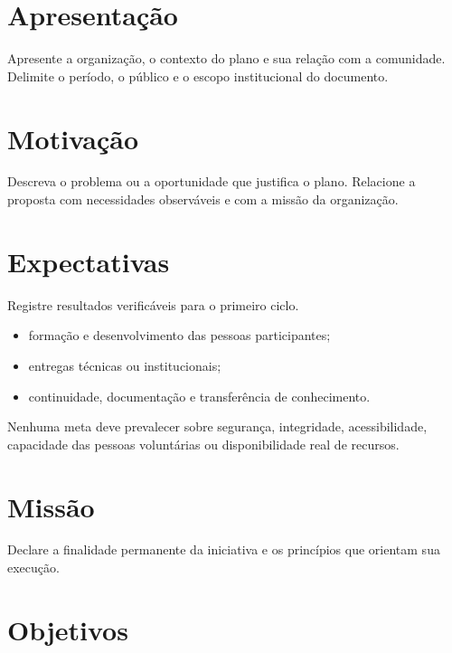 \documentclass[ %
  paper-size=a4,
  font-size=11pt,
  two-sided=true,
  title-page=true,
  section-numbering=two-digit,
  inner-margin=22mm,
  outer-margin=22mm,
  top-margin=24mm,
  bottom-margin=28mm,
  binding-offset=0mm,
  color-model=rgb
]{ieeeufgcs}
\begin{document}
\maketitle

\section{Apresentação}

Apresente a organização, o contexto do plano e sua relação com a comunidade.
Delimite o período, o público e o escopo institucional do documento.

\section{Motivação}

Descreva o problema ou a oportunidade que justifica o plano. Relacione a
proposta com necessidades observáveis e com a missão da organização.

\section{Expectativas}

Registre resultados verificáveis para o primeiro ciclo.

\begin{itemize}
  \item formação e desenvolvimento das pessoas participantes;
  \item entregas técnicas ou institucionais;
  \item continuidade, documentação e transferência de conhecimento.
\end{itemize}

\begin{IEEECSNotice}
Nenhuma meta deve prevalecer sobre segurança, integridade, acessibilidade,
capacidade das pessoas voluntárias ou disponibilidade real de recursos.
\end{IEEECSNotice}

\section{Missão}

Declare a finalidade permanente da iniciativa e os princípios que orientam
sua execução.

\section{Objetivos}
\end{document}
